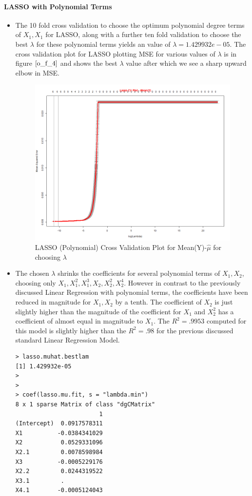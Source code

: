 \documentclass[twoside,12pt]{article}
\begin{document}
\paragraph{LASSO with Polynomial Terms}
\begin{itemize}

\item
The 10 fold cross validation to choose the optimum polynomial degree terms of $X_1,X_1$ for LASSO, along with a further ten fold validation to choose the best $\lambda$ for these polynomial terms yields an value of $\lambda=1.429932e-05$. The cross validation plot for LASSO plotting MSE for various values of $\lambda$ is in figure $\eqref{o_f_4}$ and shows the best $\lambda$ value after which we see a sharp upward elbow in MSE.
\FloatBarrier
\begin{figure}[!htbp]
\centering
\includegraphics[scale=.50]{images/lasso_cv_plot_mean.png} 
\caption{LASSO (Polynomial) Cross Validation Plot for Mean(Y)-$\hat{\mu}$ for choosing $\lambda$}
\label{o_f_4}
\end{figure}

\FloatBarrier
\item
The chosen $\lambda$ shrinks the coefficients for several polynomial terms of $X_1,X_2$, choosing only $X_1,X_1^2,X_1^3,X_2,X_2^2,X_2^4$. However in contrast to the previously discussed Linear Regression with polynomial terms, the coefficients have been reduced in magnitude for $X_1,X_2$ by a tenth. The coefficient of $X_2$ is just slightly higher than the magnitude of the coefficient for $X_1$ and $X_2^2$ has a coefficient of almost equal in magnitude to $X_1$. The $R^2=.9953$ computed for this model is slightly higher than the $R^2=.98$ for the previous discussed standard Linear Regression Model.
\begin{verbatim}
> lasso.muhat.bestlam
[1] 1.429932e-05
>
>
> coef(lasso.mu.fit, s = "lambda.min")
8 x 1 sparse Matrix of class "dgCMatrix"
                        1
(Intercept)  0.0917578311
X1          -0.0384341029
X2           0.0529331096
X2.1         0.0078598984
X3          -0.0005229176
X2.2         0.0244319522
X3.1         .           
X4.1        -0.0005124043


\end{verbatim}
\end{itemize}
\end{document}
